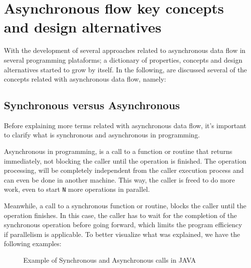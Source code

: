
\section{Asynchronous flow key concepts and design alternatives} %
\label{sec:async_concepts}

With the development of several approaches related to asynchronous data flow in several programming plataforms; a dictionary
of properties, concepts and design alternatives started to grow by itself. In the following, are discussed several of the concepts related with asynchronous data flow, namely:

\subsection{Synchronous versus Asynchronous}
	Before explaining more terms related with asynchronous data flow, it's important to clarify what is synchronous and asynchronous in programming. 
	
	Asynchronous in programming, is a call to a function or routine that returns immediately, not blocking the caller until the operation is finished. The operation processing, will be completely independent from the caller execution process and can even be done in another machine. This way, the caller is freed to do more work, even to start \texttt{N} more operations in parallel. 
	
	Meanwhile, a call to a synchronous function or routine, blocks the caller until the operation finishes. In this case, the caller has to wait for the completion of the synchronous operation before going forward, which limits the program efficiency if parallelism is applicable.
	To better visualize what was explained, we have the following examples: 
	
	\begin{figure}[H]
		\centering
		\begin{subfigure}[h]{1.2\textwidth}
			\centering
			\label{fig:ra-vectorial}
		 \end{subfigure}	
	\qquad
		 \begin{subfigure}[h]{1.2\textwidth}
			\centering
			\label{fig:ra-raster}
		\end{subfigure}		
	  \caption{Example of Synchronous and Asynchronous calls in JAVA}
	  \label{fig:figura-completa}
	\end{figure}
	
